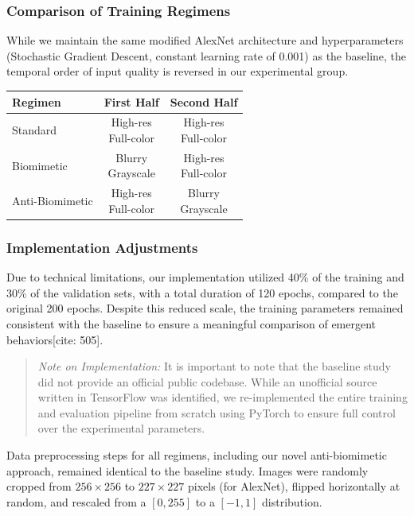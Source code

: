 \begin{multicols}{2}
\subsubsection{Comparison of Training Regimens}
While we maintain the same modified AlexNet architecture and hyperparameters (Stochastic Gradient Descent, constant learning rate of 0.001) as the baseline, the temporal order of input quality is reversed in our experimental group.

\begin{center}
\label{tab:regimens}
\begin{tabular}{@{}lcc@{}}
\toprule
\textbf{Regimen} & \textbf{First Half} & \textbf{Second Half} \\ \midrule
Standard & \shortstack{High-res\\Full-color} & \shortstack{High-res\\Full-color} \\ \midrule
Biomimetic & \shortstack{Blurry\\Grayscale} & \shortstack{High-res\\Full-color} \\ \midrule
Anti-Biomimetic & \shortstack{High-res\\Full-color} & \shortstack{Blurry\\Grayscale} \\ \bottomrule
\end{tabular}
\end{center}

\subsubsection{Implementation Adjustments}
Due to technical limitations, our implementation utilized 40\% of the training and 30\% of the validation sets, with a total duration of 120 epochs, compared to the original 200 epochs. Despite this reduced scale, the training parameters remained consistent with the baseline to ensure a meaningful comparison of emergent behaviors[cite: 505].

\begin{quote}
    \textit{Note on Implementation:} It is important to note that the baseline study did not provide an official public codebase. While an unofficial source written in TensorFlow was identified, we re-implemented the entire training and evaluation pipeline from scratch using PyTorch to ensure full control over the experimental parameters.
\end{quote}

Data preprocessing steps for all regimens, including our novel anti-biomimetic approach, remained identical to the baseline study. Images were randomly cropped from $256 \times 256$ to $227 \times 227$ pixels (for AlexNet), flipped horizontally at random, and rescaled from a $[0, 255]$ to a $[-1, 1]$ distribution.



\end{multicols}


